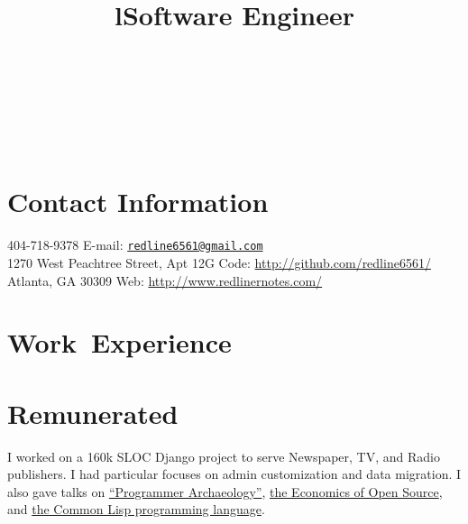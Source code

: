\documentclass[margintitle,line]{res}
\renewcommand{\subsection}[1]{\section{\normalfont #1}}
\begin{document}

\begin{resume}

\begin{format}
\\
\title{l}\\
\body\\
\end{format}



\section{Contact Information}

404-718-9378 \hfill {E-mail:} \href{mailto:redline6561@gmail.com}{\nolinkurl{redline6561@gmail.com}} \\
1270 West Peachtree Street, Apt 12G \hfill {Code:} \url{http://github.com/redline6561/} \\
Atlanta, GA 30309 \hfill {Web:} \url{http://www.redlinernotes.com/} \\


\section{\mbox{Work Experience}}

\subsection{Remunerated}

\title{Software Engineer}
\begin{position}
  I worked on a 160k SLOC Django project to serve Newspaper, TV, and Radio publishers.
  I had particular focuses on admin customization and data migration. I also gave talks
  on \href{http://redlinernotes.com/docs/talks/opa.html}{``Programmer Archaeology''},
  \href{http://redlinernotes.com/docs/talks/wosw.html}{the Economics of Open Source}, and
  \href{http://redlinernotes.com/docs/talks/cl-gbu.html}{the Common Lisp programming language}.
\end{position}


\end{resume}
\end{document}
